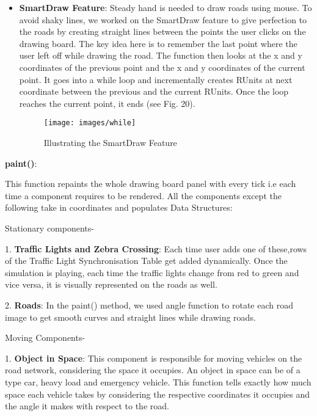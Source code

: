 \documentclass[11pt,a4paper]{article}
\begin{document}
\begin{itemize}
  	 \item \textbf{SmartDraw Feature}: Steady hand is needed to draw roads using mouse. To avoid shaky lines, we worked on the SmartDraw feature to give perfection to the roads by creating straight lines between the points the user clicks on the drawing board. The key idea here is to remember the last point where the user left
  		off while drawing the road. The function then looks at the x and y
  		coordinates of the previous point and the x and y coordinates of
  		the current point. It goes into a while loop and incrementally
  		creates RUnits at next coordinate between the previous and the
  		current RUnits. Once the loop reaches the current point, it ends (see Fig. 20).
  		
  		\begin{figure}[h!]
			\texttt{[image: images/while]}
			\caption{Illustrating the SmartDraw Feature}
			\centering
		\end{figure} 

  \end{itemize}
  
  \textbf{paint()}:

  		This function repaints the whole drawing board panel with every tick
  i.e each time a component requires to be rendered.
  All the components except the following take in coordinates and
  populates Data Structures:
  
  \setlength{\parindent}{0cm}\bigskip
  Stationary components- 
	
  1. \textbf{ Traffic Lights and Zebra Crossing}: Each time user adds one of these,rows of the Traffic Light Synchronisation Table get added dynamically. Once the simulation is playing, each time the traffic lights change from red to green and vice versa, it is visually represented on the roads as well.
    
  2. \textbf{ Roads}: In the paint() method, we used angle function to rotate each road image to get smooth curves and straight lines while drawing roads.
 
  \setlength{\parindent}{0cm}\bigskip
  Moving Components-
  
  1. \textbf{Object in Space}: This component is responsible for moving vehicles on the road network, considering the space it occupies. An object in space can be of a type car, heavy load and emergency vehicle. This function tells exactly how much space each vehicle takes by considering the respective coordinates it occupies and the angle it makes with respect to the road.
\end{document}
